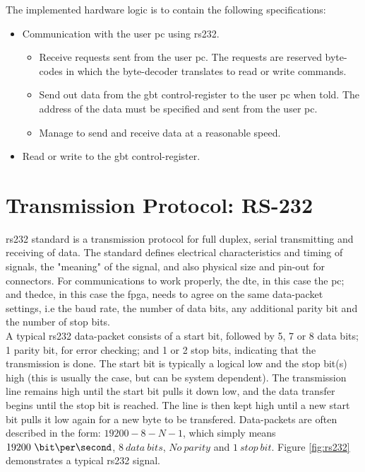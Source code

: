 \documentclass[main.tex]{subfiles}
\begin{document}
The implemented hardware logic is to contain the following specifications:\\
\begin{itemize} \setlength{\itemsep}{10pt}
\item Communication with the user \acrshort{pc} using \acrshort{rs232}.
  \begin{itemize}
  \item Receive requests sent from the user \acrshort{pc}. The requests are reserved byte-codes in which the byte-decoder translates to read or write commands. 
  \item Send out data from the \gls{gbt} control-register to the user \acrshort{pc} when told. The address of the data must be specified and sent from the user \acrshort{pc}.
  \item Manage to send and receive data at a reasonable speed. 
  \end{itemize}
\item Read or write to the \gls{gbt} control-register.
\end{itemize}

\section{Transmission Protocol: RS-232}

\acrshort{rs232} standard is a transmission protocol for full duplex, serial transmitting and receiving of data. The standard defines electrical characteristics and timing of signals, the "meaning" of the signal, and also physical size and pin-out for connectors.
For communications to work properly, the \gls{dte}, in this case the \acrshort{pc}; and the\gls{dce}, in this case the \gls{fpga}, needs to agree on the same data-packet settings, i.e the baud rate, the number of data bits, any additional parity bit and the number of stop bits.\\

A typical \acrshort{rs232} data-packet consists of a start bit, followed by 5, 7 or 8 data bits; 1 parity bit, for error checking; and 1 or 2 stop bits, indicating that the transmission is done. The start bit is typically a logical low and the stop bit(s) high (this is usually the case, but can be system dependent). The transmission line remains high until the start bit pulls it down low, and the data transfer begins until the stop bit is reached. The line is then kept high until a new start bit pulls it low again for a new byte to be transfered. Data-packets are often described in the form: $19200-8-N-1$, which simply means $19200~ \bit\per\second$, $8~ data~ bits$, $No~ parity$ and $1~ stop~ bit$. Figure \ref{fig:rs232} demonstrates a typical \acrshort{rs232} signal.\\
\end{document}
